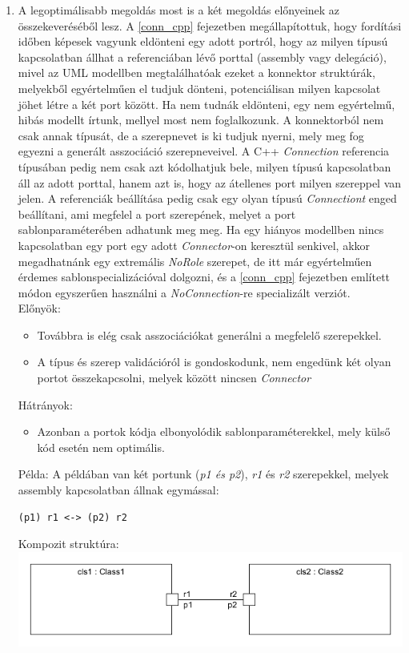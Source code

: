 \documentclass[a4paper,12pt]{report}
\begin{document}
\begin{enumerate}
\item A legoptimálisabb megoldás most is a két megoldás előnyeinek az összekeveréséből lesz. A \ref{conn_cpp} fejezetben megállapítottuk, hogy fordítási időben képesek vagyunk eldönteni egy adott portról, hogy az milyen típusú kapcsolatban állhat a referenciában lévő porttal (assembly vagy delegáció), mivel az UML modellben megtalálhatóak ezeket a konnektor struktúrák, melyekből egyértelműen el tudjuk dönteni, potenciálisan milyen kapcsolat jöhet létre a két port között. Ha nem tudnák eldönteni, egy nem egyértelmű, hibás modellt írtunk, mellyel most nem foglalkozunk. A konnektorból nem csak annak típusát, de a szerepnevet is ki tudjuk nyerni, mely meg fog egyezni a generált asszociáció szerepneveivel. A C++ \textit{Connection} referencia típusában pedig nem csak azt kódolhatjuk bele, milyen típusú kapcsolatban áll az adott porttal, hanem azt is, hogy az átellenes port milyen szereppel van jelen. A referenciák beállítása pedig csak egy olyan típusú \textit{Connectiont} enged beállítani, ami megfelel a port szerepének,  melyet a  port sablonparaméterében adhatunk meg meg. Ha egy hiányos modellben nincs kapcsolatban egy port egy adott \textit{Connector}-on keresztül senkivel, akkor megadhatnánk egy extremális \textit{NoRole} szerepet, de itt már egyértelműen érdemes sablonspecializációval dolgozni, és a \ref{conn_cpp} fejezetben említett módon egyszerűen használni a \textit{NoConnection}-re specializált verziót.  \\
Előnyök:
\begin{itemize}
\item Továbbra is elég csak asszociációkat generálni a megfelelő szerepekkel.
\item A típus és szerep validációról is gondoskodunk, nem engedünk két olyan portot összekapcsolni, melyek között nincsen \textit{Connector}
\end{itemize}
Hátrányok:
\begin{itemize}
\item Azonban a portok kódja elbonyolódik sablonparaméterekkel, mely külső kód esetén nem optimális.
\end{itemize}
Példa:
A példában van két portunk (\textit{p1 és p2}), \textit{r1} és \textit{r2} szerepekkel, melyek assembly kapcsolatban állnak egymással:
\begin{lstlisting}
(p1) r1 <-> (p2) r2
\end{lstlisting}
Kompozit struktúra: \\
\includegraphics[scale=0.6]{conn_role_comp.png}


\end{enumerate}
\end{document}
